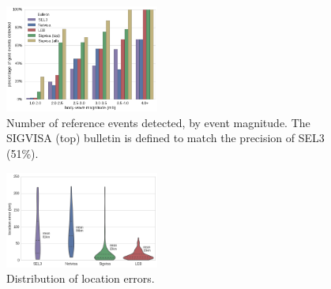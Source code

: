 \documentclass[twoside]{article} \usepackage{aistats2017}
\begin{document}
\begin{figure}
\centering
    \includegraphics[width=0.45\textwidth]{isc_detections_by_mb}
    \caption{Number of reference events detected, by event
      magnitude. The SIGVISA (top) bulletin is defined to match the
      precision of SEL3 (51\%).}
  \label{fig:isc_evs_by_mb}
\end{figure}


\begin{figure}
\centering
    \includegraphics[width=0.45\textwidth]{location_err_violin_test}
    \caption{Distribution of location errors.}
  \label{fig:test_location_err}
\end{figure}
\end{document}
